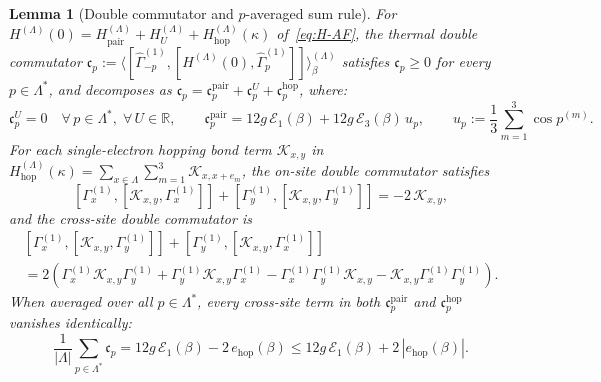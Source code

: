 \documentclass[11pt]{article}
\newtheorem{lemma}[theorem]{Lemma}
\theoremstyle{definition}
\theoremstyle{remark}
\newcommand{\calE}{\mathcal{E}}
\newcommand{\calK}{\mathcal{K}}
\newcommand{\bbR}{\mathbb{R}}
\begin{document}
\begin{lemma}[Double commutator and $p$-averaged sum rule]\label{lem:double-comm}
For $H^{(\Lambda)}(0) = H_{\mathrm{pair}}^{(\Lambda)} + H_U^{(\Lambda)} + H_{\mathrm{hop}}^{(\Lambda)}(\kappa)$ of~\eqref{eq:H-AF}, the thermal double commutator $\mathfrak{c}_p := \langle [\hat{\Gamma}_{-p}^{(1)}, [H^{(\Lambda)}(0), \hat{\Gamma}_p^{(1)}]] \rangle_\beta^{(\Lambda)}$ satisfies $\mathfrak{c}_p \ge 0$ for every $p \in \Lambda^*$, and decomposes as $\mathfrak{c}_p = \mathfrak{c}_p^{\mathrm{pair}} + \mathfrak{c}_p^U + \mathfrak{c}_p^{\mathrm{hop}}$, where:
\begin{equation}\label{eq:cp-U-pair}
\mathfrak{c}_p^U = 0 \quad \forall\, p \in \Lambda^*,\;\forall\, U \in \bbR, \qquad \mathfrak{c}_p^{\mathrm{pair}} = 12 g\,\calE_1(\beta) + 12 g\,\calE_3(\beta)\,u_p, \qquad u_p := \frac{1}{3}\sum_{m=1}^3 \cos p^{(m)}.
\end{equation}
For each single-electron hopping bond term $\calK_{x,y}$ in $H_{\mathrm{hop}}^{(\Lambda)}(\kappa) = \sum_{x \in \Lambda}\sum_{m=1}^3 \calK_{x,x+e_m}$, the on-site double commutator satisfies
\begin{equation}\label{eq:onsite-hop-dc}
[\Gamma_x^{(1)}, [\calK_{x,y}, \Gamma_x^{(1)}]] + [\Gamma_y^{(1)}, [\calK_{x,y}, \Gamma_y^{(1)}]] = -2\,\calK_{x,y},
\end{equation}
and the cross-site double commutator is
\begin{multline}\label{eq:cross-hop-dc}
[\Gamma_x^{(1)}, [\calK_{x,y}, \Gamma_y^{(1)}]] + [\Gamma_y^{(1)}, [\calK_{x,y}, \Gamma_x^{(1)}]] \\
= 2\left(\Gamma_x^{(1)}\calK_{x,y}\Gamma_y^{(1)} + \Gamma_y^{(1)}\calK_{x,y}\Gamma_x^{(1)} - \Gamma_x^{(1)}\Gamma_y^{(1)}\calK_{x,y} - \calK_{x,y}\Gamma_x^{(1)}\Gamma_y^{(1)}\right).
\end{multline}
When averaged over all $p \in \Lambda^*$, every cross-site term in both $\mathfrak{c}_p^{\mathrm{pair}}$ and $\mathfrak{c}_p^{\mathrm{hop}}$ vanishes identically:
\begin{equation}\label{eq:p-avg-dc}
\frac{1}{|\Lambda|} \sum_{p \in \Lambda^*} \mathfrak{c}_p = 12 g\,\calE_1(\beta) - 2\,e_{\mathrm{hop}}(\beta) \le 12 g\,\calE_1(\beta) + 2\,|e_{\mathrm{hop}}(\beta)|.
\end{equation}
\end{lemma}
\end{document}
